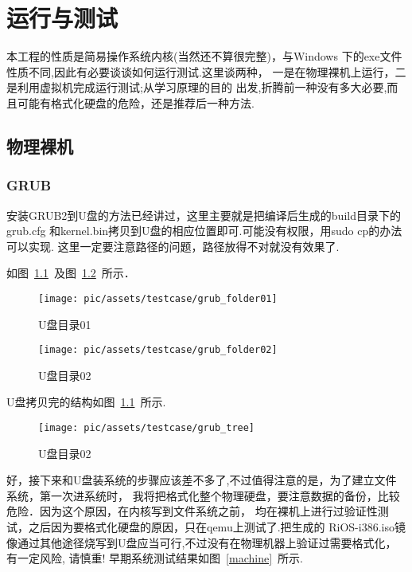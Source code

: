 \chapter{运行与测试} 
本工程的性质是简易操作系统内核(当然还不算很完整)，与Windows
下的exe文件性质不同,因此有必要谈谈如何运行测试.这里谈两种，
一是在物理裸机上运行，二是利用虚拟机完成运行测试;从学习原理的目的
出发,折腾前一种没有多大必要,而且可能有格式化硬盘的危险，还是推荐后一种方法.

\section{物理裸机}
\subsection{GRUB}
安装GRUB2到U盘的方法已经讲过，这里主要就是把编译后生成的build目录下的grub.cfg
和kernel.bin拷贝到U盘的相应位置即可.可能没有权限，用sudo cp的办法可以实现.
这里一定要注意路径的问题，路径放得不对就没有效果了.

如图~\ref{grub_folder01}~及图~\ref{grub_folder02}~所示．		

\begin{figure}[!htbp]
		\centering	\texttt{[image: pic/assets/testcase/grub\_folder01]}
		\caption{U盘目录01}	\label{grub_folder01}	\end{figure}



\begin{figure}[!htbp]
		\centering	\texttt{[image: pic/assets/testcase/grub\_folder02]}
		\caption{U盘目录02}	\label{grub_folder02}	\end{figure}

U盘拷贝完的结构如图~\ref{grub_folder01}~所示.

\begin{figure}[!htbp]
		\centering	\texttt{[image: pic/assets/testcase/grub\_tree]}
        \caption{U盘目录02}	\label{grub_tree}	\end{figure}
        
好，接下来和U盘装系统的步骤应该差不多了,不过值得注意的是，为了建立文件系统，第一次进系统时，
我将把格式化整个物理硬盘，要注意数据的备份，比较危险．因为这个原因，在内核写到文件系统之前，
均在裸机上进行过验证性测试，之后因为要格式化硬盘的原因，只在qemu上测试了.把生成的
RiOS-i386.iso镜像通过其他途径烧写到U盘应当可行,不过没有在物理机器上验证过需要格式化，有一定风险,
请慎重!
早期系统测试结果如图~\ref{machine}~所示.


